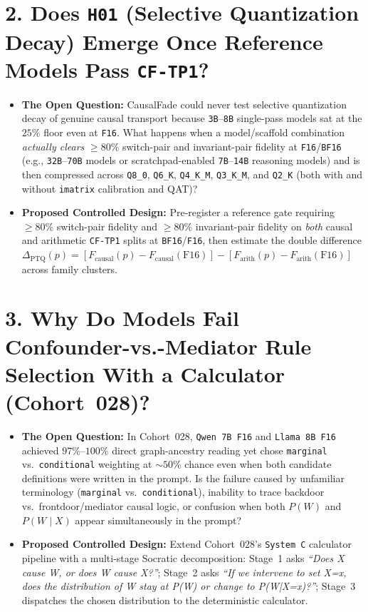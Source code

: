 \section{2. Does \texttt{H01} (Selective Quantization Decay) Emerge Once Reference Models Pass \texttt{CF-TP1}?}
\begin{itemize}
  \item \textbf{The Open Question:} CausalFade could never test selective quantization decay of genuine causal transport because \texttt{3B}--\texttt{8B} single-pass models sat at the $25\%$ floor even at \texttt{F16}. What happens when a model/scaffold combination \emph{actually clears} $\ge 80\%$ switch-pair and invariant-pair fidelity at \texttt{F16}/\texttt{BF16} (e.g., \texttt{32B}--\texttt{70B} models or scratchpad-enabled \texttt{7B}--\texttt{14B} reasoning models) and is then compressed across \texttt{Q8\_0}, \texttt{Q6\_K}, \texttt{Q4\_K\_M}, \texttt{Q3\_K\_M}, and \texttt{Q2\_K} (both with and without \texttt{imatrix} calibration and QAT)?
  \item \textbf{Proposed Controlled Design:} Pre-register a reference gate requiring $\ge 80\%$ switch-pair fidelity and $\ge 80\%$ invariant-pair fidelity on \emph{both} causal and arithmetic \texttt{CF-TP1} splits at \texttt{BF16}/\texttt{F16}, then estimate the double difference $\Delta_{\mathrm{PTQ}}(p) = [F_{\mathrm{causal}}(p) - F_{\mathrm{causal}}(\text{F16})] - [F_{\mathrm{arith}}(p) - F_{\mathrm{arith}}(\text{F16})]$ across family clusters.
\end{itemize}

\section{3. Why Do Models Fail Confounder-vs.-Mediator Rule Selection With a Calculator (Cohort~028)?}
\begin{itemize}
  \item \textbf{The Open Question:} In Cohort~028, \texttt{Qwen 7B F16} and \texttt{Llama 8B F16} achieved $97\%$--$100\%$ direct graph-ancestry reading yet chose \texttt{marginal} vs.\ \texttt{conditional} weighting at $\sim 50\%$ chance even when both candidate definitions were written in the prompt. Is the failure caused by unfamiliar terminology (\texttt{marginal} vs.\ \texttt{conditional}), inability to trace backdoor vs.\ frontdoor/mediator causal logic, or confusion when both $P(W)$ and $P(W\mid X)$ appear simultaneously in the prompt?
  \item \textbf{Proposed Controlled Design:} Extend Cohort~028's \texttt{System C} calculator pipeline with a multi-stage Socratic decomposition: Stage~1 asks \emph{``Does X cause W, or does W cause X?''}; Stage~2 asks \emph{``If we intervene to set X=x, does the distribution of W stay at P(W) or change to P(W|X=x)?''}; Stage~3 dispatches the chosen distribution to the deterministic calculator.
\end{itemize}

